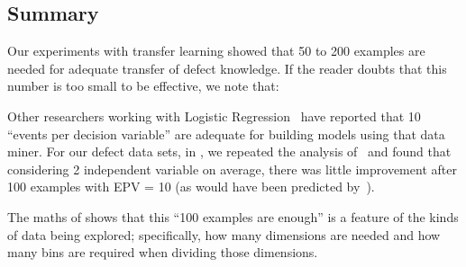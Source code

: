 \subsection{Summary}
Our experiments with transfer learning showed that 50 to 200 examples are needed for adequate
transfer of defect knowledge. If the reader doubts that this number is too small to be effective,
we note that:
\bi
\item Other researchers working with Logistic Regression~\cite{peduzzi1996simulation}
have reported that 10 ``events per decision variable'' are adequate for building models using that
data miner. For our defect data sets, in , we repeated the analysis of~\cite{peduzzi1996simulation}
and found that considering 2 independent variable on average, there was little improvement after 100 examples with EPV = 10 (as would have been predicted by~\cite{peduzzi1996simulation}).
\item The maths of  shows that this ``100 examples are enough'' is a feature of the kinds of
data being explored; specifically, how many dimensions are needed and how many bins are required when dividing
those dimensions.
\ei
